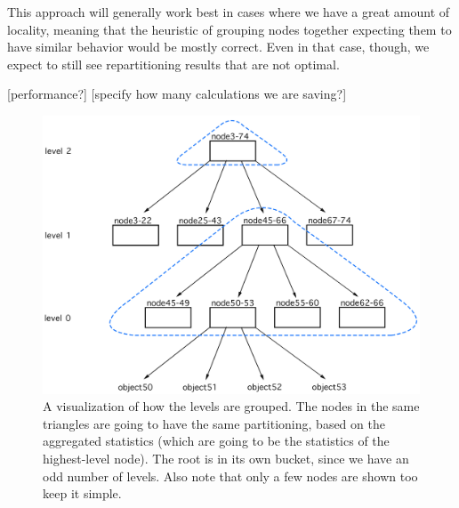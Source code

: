 This approach will generally work best in cases where we have a great amount of locality, meaning that the heuristic of grouping nodes together expecting them to have similar behavior would be mostly correct. Even in that case, though, we expect to still see repartitioning results that are not optimal.

[performance?]
[specify how many calculations we are saving?]

\begin{figure}[!htb]
  \centering
  \includegraphics[width=\textwidth,height=\textheight,keepaspectratio]{img/grouped-levels.png}
  \caption[caption]{ A visualization of how the levels are grouped. The nodes in the same triangles are going to have the same partitioning, based on the aggregated statistics (which are going to be the statistics of the highest-level node). The root is in its own bucket, since we have an odd number of levels. Also note that only a few nodes are shown too keep it simple.}
  \label{fig:Fixed-Size-buckets}
\end{figure}

